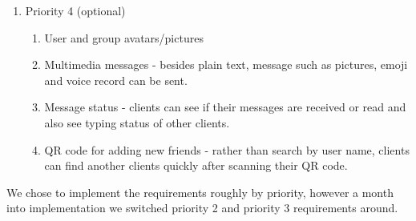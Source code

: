 \begin{enumerate}
\begin{enumerate}[label*=\arabic*.]
\end{enumerate}
\item Priority 4 (optional)
\begin{enumerate}[label*=\arabic*.]
\item User and group avatars/pictures
\item Multimedia messages - besides plain text, message such as pictures, emoji and voice record can be sent.
\item Message status - clients can see if their messages are received or read and also see  typing status of other clients.
\item QR code for adding new friends - rather than search by user name, clients can find another clients quickly after scanning their QR code.
\end{enumerate}
\end{enumerate}

We chose to implement the requirements roughly by priority, however a month into implementation we switched priority 2 and priority 3 requirements around. 

